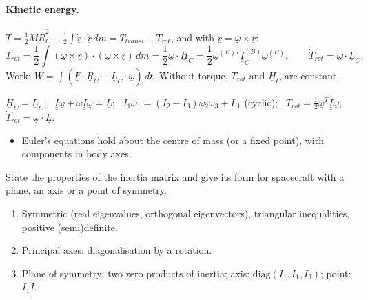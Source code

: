 \paragraph{Kinetic energy.} $T=\frac12M\dot R_C^2+\frac12\int\dot{\underline r}\cdot\dot{\underline r}\,dm=T_{transl}+T_{rot}$, and with $\dot{\underline r}=\underline\omega\times\underline r$:
\begin{equation}
T_{rot}=\frac12\int(\underline\omega\times\underline r)\cdot(\underline\omega\times\underline r)\,dm=\frac12\underline\omega\cdot\underline H_C=\frac12\underline\omega^{(B)T}\underline{\underline I}_C^{(B)}\underline\omega^{(B)},\qquad
\dot T_{rot}=\underline\omega\cdot\underline L_C .
\end{equation}
Work: $W=\int(\underline F\cdot\dot{\underline R}_C+\underline L_C\cdot\underline\omega)\,dt$. Without torque, $T_{rot}$ and $\underline H_C$ are constant.
\begin{keyf}
$\dot{\underline H}_C=\underline L_C$; \ $\underline{\underline I}\dot{\underline\omega}+\tilde\omega\underline{\underline I}\underline\omega=\underline L$; \ $I_1\dot\omega_1=(I_2-I_3)\omega_2\omega_3+L_1$ (cyclic); \ $T_{rot}=\frac12\underline\omega^T\underline{\underline I}\underline\omega$, $\dot T_{rot}=\underline\omega\cdot\underline L$.
\end{keyf}
\pitfalls
\begin{itemize}
\item Euler's equations hold about the centre of mass (or a fixed point), with components in body axes.
\end{itemize}

\begin{qbox}
State the properties of the inertia matrix and give its form for spacecraft with a plane, an axis or a point of symmetry.
\end{qbox}
\begin{outline}
\begin{enumerate}
\item Symmetric (real eigenvalues, orthogonal eigenvectors), triangular inequalities, positive (semi)definite.
\item Principal axes: diagonalisation by a rotation.
\item Plane of symmetry: two zero products of inertia; axis: $\mathrm{diag}(I_1,I_1,I_3)$; point: $I_1\underline{\underline I}$.
\end{enumerate}
\end{outline}
\answer
